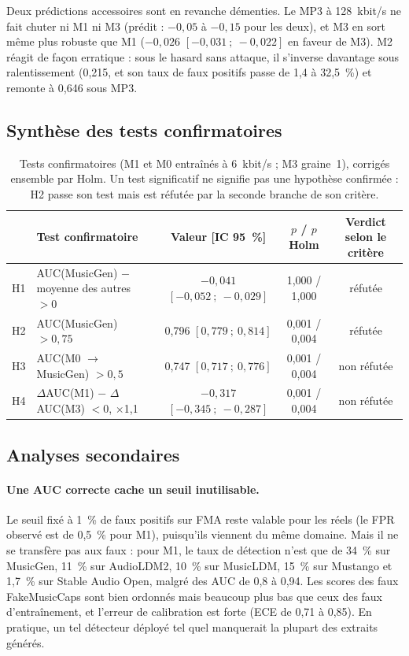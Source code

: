 \documentclass[a4paper, 11pt]{article}
\begin{document}
Deux prédictions accessoires sont en revanche démenties. Le MP3 à 128~kbit/s ne fait chuter ni M1 ni M3
(prédit : $-0{,}05$ à $-0{,}15$ pour les deux), et M3 en sort même plus robuste que M1 ($-0{,}026$
$[-0{,}031~;~-0{,}022]$ en faveur de M3). M2 réagit de façon erratique : sous le hasard sans attaque, il
s'inverse davantage sous ralentissement (0,215, et son taux de faux positifs passe de 1,4 à 32,5~\%) et
remonte à 0,646 sous MP3.

\subsection{Synthèse des tests confirmatoires}

\begin{table}[h]
    \centering
    \small
    \begin{tabularx}{\textwidth}{lYccc}
        \toprule
        & Test confirmatoire & Valeur [IC 95~\%] & $p$ / $p$ Holm & Verdict selon le critère \\
        \midrule
        H1 & AUC(MusicGen) $-$ moyenne des autres $> 0$ & $-0{,}041$ $[-0{,}052~;~-0{,}029]$ & 1,000 / 1,000 & réfutée \\
        H2 & AUC(MusicGen) $> 0{,}75$ & 0,796 $[0{,}779~;~0{,}814]$ & 0,001 / 0,004 & réfutée \\
        H3 & AUC(M0 $\to$ MusicGen) $> 0{,}5$ & 0,747 $[0{,}717~;~0{,}776]$ & 0,001 / 0,004 & non réfutée \\
        H4 & $\Delta$AUC(M1) $-$ $\Delta$AUC(M3) $< 0$, $\times$1,1 & $-0{,}317$ $[-0{,}345~;~-0{,}287]$ & 0,001 / 0,004 & non réfutée \\
        \bottomrule
    \end{tabularx}
    \caption{Tests confirmatoires (M1 et M0 entraînés à 6~kbit/s ; M3 graine~1), corrigés ensemble par Holm.
    Un test significatif ne signifie pas une hypothèse confirmée : H2 passe son test mais est réfutée par la
    seconde branche de son critère.}
    \label{tab:confirmatoires}
\end{table}

\subsection{Analyses secondaires}

\paragraph{Une AUC correcte cache un seuil inutilisable.} Le seuil fixé à 1~\% de faux positifs sur FMA
reste valable pour les réels (le FPR observé est de 0,5~\% pour M1), puisqu'ils viennent du même domaine.
Mais il ne se transfère pas aux faux : pour M1, le taux de détection n'est que de 34~\% sur MusicGen, 11~\%
sur AudioLDM2, 10~\% sur MusicLDM, 15~\% sur Mustango et 1,7~\% sur Stable Audio Open, malgré des AUC de
0,8 à 0,94. Les scores des faux FakeMusicCaps sont bien ordonnés mais beaucoup plus bas que ceux des faux
d'entraînement, et l'erreur de calibration est forte (ECE de 0,71 à 0,85). En pratique, un tel détecteur
déployé tel quel manquerait la plupart des extraits générés.
\end{document}
